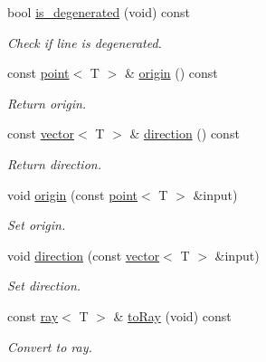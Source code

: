 \begin{DoxyCompactItemize}
\mbox{\label{classddd_1_1line_a27dd2c4d6a8abc7c101581357fcb17be}} 
bool \hyperlink{classddd_1_1line_a27dd2c4d6a8abc7c101581357fcb17be}{is\+\_\+degenerated} (void) const
\begin{DoxyCompactList}\small\item\em Check if line is degenerated. \end{DoxyCompactList}\item 
\mbox{\label{classddd_1_1line_a229e71bc976e64ac6129d14113a0d529}} 
const \hyperlink{classddd_1_1point}{point}$<$ T $>$ \& \hyperlink{classddd_1_1line_a229e71bc976e64ac6129d14113a0d529}{origin} () const
\begin{DoxyCompactList}\small\item\em Return origin. \end{DoxyCompactList}\item 
\mbox{\label{classddd_1_1line_a49d6c131bbf73688280bafadfd284e8b}} 
const \hyperlink{classddd_1_1vector}{vector}$<$ T $>$ \& \hyperlink{classddd_1_1line_a49d6c131bbf73688280bafadfd284e8b}{direction} () const
\begin{DoxyCompactList}\small\item\em Return direction. \end{DoxyCompactList}\item 
void \hyperlink{classddd_1_1line_a531225ea04ea5f147adf76505ab13bcc}{origin} (const \hyperlink{classddd_1_1point}{point}$<$ T $>$ \&input)
\begin{DoxyCompactList}\small\item\em Set origin. \end{DoxyCompactList}\item 
void \hyperlink{classddd_1_1line_a67a08be8f16587b17cb7a9fb927f9c32}{direction} (const \hyperlink{classddd_1_1vector}{vector}$<$ T $>$ \&input)
\begin{DoxyCompactList}\small\item\em Set direction. \end{DoxyCompactList}\item 
\mbox{\label{classddd_1_1line_a5107d974e903d63524040349be5616f2}} 
const \hyperlink{classddd_1_1ray}{ray}$<$ T $>$ \& \hyperlink{classddd_1_1line_a5107d974e903d63524040349be5616f2}{to\+Ray} (void) const
\begin{DoxyCompactList}\small\item\em Convert to ray. \end{DoxyCompactList}\item 

\end{DoxyCompactItemize}
